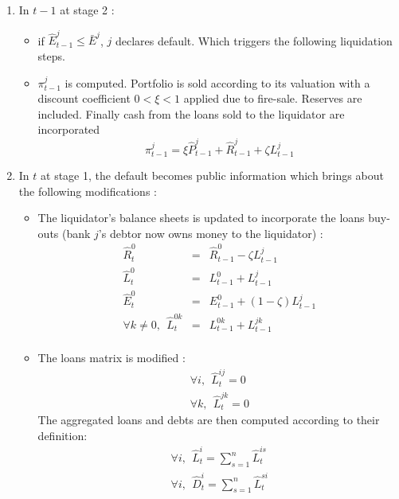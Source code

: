 \documentclass{article}
\newcommand{\wh}{\widehat}
\begin{document}
 \begin{enumerate}
 
    \item In $t-1$ at stage 2 :
    \begin{itemize}
        \item if $\widehat{E}_{t-1}^j \leq \bar{E}^j$, $j$ declares default. Which triggers the following liquidation steps.
        \item $\pi_{t-1}^j$ is computed. Portfolio is sold according to its valuation with a discount coefficient $0 < \xi < 1$ applied due to fire-sale. Reserves are included. Finally cash from the loans sold to the liquidator are incorporated 
        $$\pi_{t-1}^j = \xi \widehat{P}_{t-1}^j + \widehat{R}_{t-1}^j + \zeta L^j_{t-1} $$ 
    \end{itemize}
    \item In $t$ at stage 1, the default becomes public information which brings about the following modifications : 
    \begin{itemize}
    
        \item The liquidator's balance sheets is updated to incorporate the loans buy-outs (bank $j$'s debtor now owns money to the liquidator) :
        \begin{eqnarray*}
        \wh R_t^0 &=& \wh R_{t-1}^0 - \zeta L^j_{t-1}\\
        \wh L_t^0 &=& L_{t-1}^0 + L^j_{t-1}\\
        \wh E_t^0 &=& E_{t-1}^0 + (1 -\zeta)L^j_{t-1}\\
        \forall k\neq 0,~~\wh L_t^{0k} &=& L_{t-1}^{0k} + L_{t-1}^{jk}\\
        \end{eqnarray*}
    
        \item The loans matrix is modified :
        \begin{eqnarray*}
        \forall i,~~ \wh L_t^{ij} = 0 \\
        \forall k,~~ \wh L_t^{jk} = 0
        \end{eqnarray*}
        The aggregated loans and debts are then computed according to their definition:
        \begin{eqnarray*}
        \forall i,~~ \wh L_t^i = \sum_{s=1}^n \wh L_t^{is} \\
        \forall i,~~ \wh D_t^i = \sum_{s=1}^n \wh L_t^{si}
        \end{eqnarray*}
        

\end{itemize}
\end{enumerate}
\end{document}
